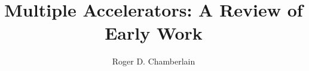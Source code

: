 \documentclass[preprint,12pt]{elsarticle}
\begin{document}
\begin{frontmatter}
\title{Multiple Accelerators: A Review of Early Work}

\author{Roger D. Chamberlain}
\address{Washington University in St. Louis, St. Louis, Missouri, USA}

\end{frontmatter}









\end{document}
